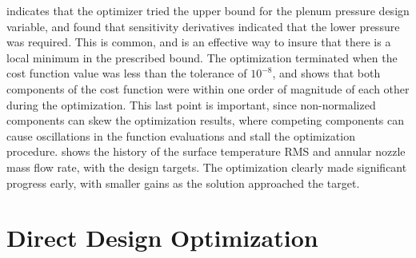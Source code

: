  indicates that the optimizer tried the upper
bound for the plenum pressure design variable, and found that sensitivity
derivatives indicated that the lower pressure was required. This is common, and
is an effective way to insure that there is a local minimum in the prescribed
bound.  The optimization terminated when the cost function value was less than
the tolerance of $10^{-8}$, and  shows that both
components of the cost function were within one order of magnitude of each other
during the optimization.  This last point is important, since non-normalized
components can skew the optimization results, where competing components can
cause oscillations in the function evaluations and stall the optimization
procedure.   shows the history of the surface
temperature RMS and annular nozzle mass flow rate, with the design targets.  The
optimization clearly made significant progress early, with smaller gains as the
solution approached the target.

\section{Direct Design Optimization}

